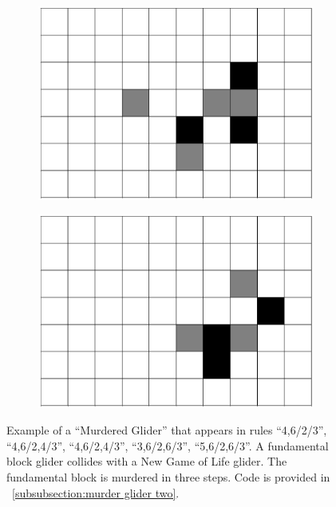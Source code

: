 \documentclass[12pt]{article}
\numberwithin{figure}{section} %
\begin{document}
\begin{figure}[htbp]
\begin{subfigure}{0.23\textwidth}
     	\subcaption{}
   	\end{subfigure}
     	\begin{subfigure}{0.23\textwidth}
     	\centering
     	\includegraphics[width=\linewidth]{Section4/33.2}
     	\subcaption{}
   	\end{subfigure}
        	\begin{subfigure}{0.23\textwidth}
     	\centering
     	\includegraphics[width=\linewidth]{Section4/33.3}
     	\subcaption{}
   	\end{subfigure}
   \caption[Another example of a "murdered glider"]{Example of a “Murdered Glider” that appears in rules “4,6/2/3”, “4,6/2,4/3”, “4,6/2,4/3”, “3,6/2,6/3”, “5,6/2,6/3”. A fundamental block glider collides with a New Game of Life glider. The fundamental block is murdered in three steps. Code is provided in ~\ref{subsubsection:murder glider two}. }
   \label{fig:murder glider two}
\end{figure}
\end{document}
